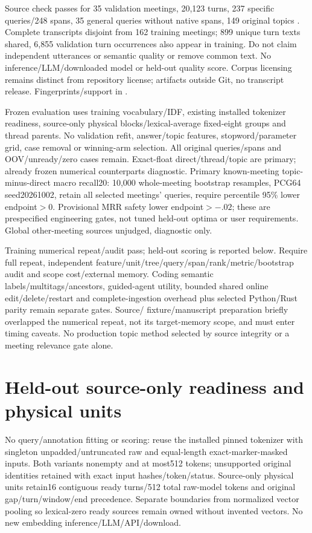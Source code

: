 \documentclass[11pt]{article}
\begin{document}
Source check passes for 35 validation meetings, 20,123 turns, 237 specific
queries/248 spans, 35 general queries without native spans, 149 original topics
\cite{zhong2021qmsum}. Complete transcripts disjoint from 162 training meetings;
899 unique turn texts shared, 6,855 validation turn occurrences also appear
in training. Do not claim independent utterances or semantic quality or remove
common text. No inference/LLM/downloaded model or held-out quality score.
Corpus licensing remains distinct from repository license; artifacts outside
Git, no transcript release. Fingerprints/support in
.

Frozen evaluation uses training vocabulary/IDF, existing installed tokenizer
readiness, source-only physical blocks/lexical-average fixed-eight groups and
thread parents. No validation refit, answer/topic features, stopword/parameter
grid, case removal or winning-arm selection. All original queries/spans and
OOV/unready/zero cases remain. Exact-float direct/thread/topic are primary;
already frozen numerical counterparts diagnostic. Primary known-meeting
topic-minus-direct macro recall20: 10,000 whole-meeting bootstrap resamples,
PCG64 seed20261002, retain all selected meetings' queries, require percentile
95\% lower endpoint$>0$. Provisional MRR safety lower endpoint$>-.02$;
these are prespecified engineering gates, not tuned held-out optima or user
requirements. Global other-meeting sources unjudged, diagnostic only.

Training numerical repeat/audit pass; held-out scoring is reported below.
Require full repeat,
independent feature/unit/tree/query/span/rank/metric/bootstrap audit and scope
cost/external memory. Coding semantic labels/multitags/ancestors, guided-agent
utility, bounded shared online edit/delete/restart and complete-ingestion
overhead plus selected Python/Rust parity remain separate gates. Source/
fixture/manuscript preparation briefly overlapped the numerical repeat,
not its target-memory scope, and must enter timing caveats. No production
topic method selected by source integrity or a meeting relevance gate alone.

\section{Held-out source-only readiness and physical units}
No query/annotation fitting or scoring: reuse the installed pinned tokenizer
with singleton unpadded/untruncated raw and equal-length exact-marker-masked
inputs. Both variants nonempty and at most512 tokens; unsupported original
identities retained with exact input hashes/token/status. Source-only physical
units retain16 contiguous ready turns/512 total raw-model tokens and original
gap/turn/window/end precedence. Separate boundaries from normalized vector
pooling so lexical-zero ready sources remain owned without invented vectors.
No new embedding inference/LLM/API/download.
\end{document}
